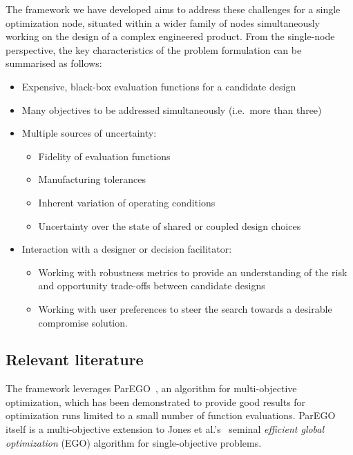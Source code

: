 \documentclass[a4paper]{article}
\begin{document}
The framework we have developed aims to address these challenges for a single optimization node, situated within a wider family of nodes simultaneously working on the design of a complex engineered product. From the single-node perspective, the key characteristics of the problem formulation can be summarised as follows:
\begin{itemize}
	\item Expensive, black-box evaluation functions for a candidate design
	\item Many objectives to be addressed simultaneously (i.e.~more than three)
	\item Multiple sources of uncertainty:
	\begin{itemize}
		\item Fidelity of evaluation functions
		\item Manufacturing tolerances
		\item Inherent variation of operating conditions
		\item Uncertainty over the state of shared or coupled design choices
	\end{itemize}
	\item Interaction with a designer or decision facilitator:
	\begin{itemize}
		\item Working with robustness metrics to provide an understanding of the risk and opportunity trade-offs between candidate designs
		\item Working with user preferences to steer the search towards a desirable compromise solution.
	\end{itemize}
\end{itemize}

\subsection{Relevant literature}
The framework leverages ParEGO~\cite{knowles2005multiobjective,Knowles2006ParEGO}, an algorithm for multi-objective optimization, which has been demonstrated to provide good results for optimization runs limited to a small number of function evaluations. ParEGO itself is a multi-objective extension to Jones et al.'s~\cite{Jones1998Efficient} seminal \emph{efficient global optimization} (EGO) algorithm for single-objective problems.
\end{document}
